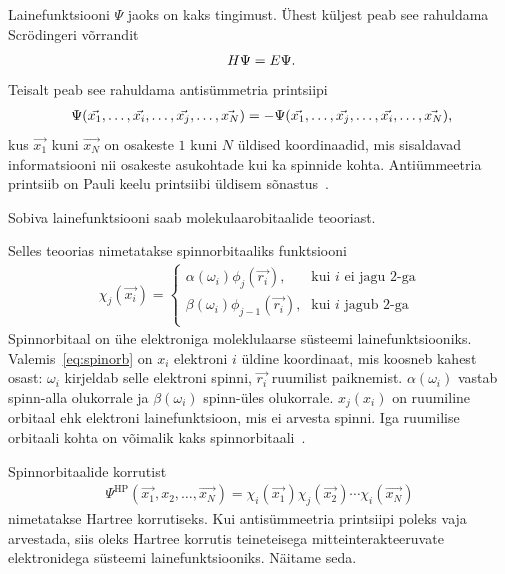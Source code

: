 \documentclass[12pt]{report}
\begin{document}
Lainefunktsiooni \(\Psi\) jaoks on kaks tingimust.
Ühest küljest peab see rahuldama Scrödingeri võrrandit
\begin{align}
    H \Psi = E \Psi \rlap{.}
\end{align}
Teisalt peab see rahuldama antisümmetria printsiipi
\begin{align}
    \Psi(\vec{x_1}, \ldots, \vec{x_i}, \ldots, \vec{x_j}, \ldots, \vec{x_N})
    = -\Psi(\vec{x_1}, \ldots, \vec{x_j}, \ldots, \vec{x_i}, \ldots, \vec{x_N}) \rlap{,}
\end{align}
kus \(\vec{x_1}\) kuni \(\vec{x_N}\) on osakeste \(1\) kuni \(N\) üldised koordinaadid, mis sisaldavad informatsiooni nii osakeste asukohtade kui ka spinnide kohta.
Antiümmeetria printsiib on Pauli keelu printsiibi üldisem sõnastus~\cite{szabo+ostlund}.

Sobiva lainefunktsiooni saab molekulaarobitaalide teooriast.

Selles teoorias nimetatakse spinnorbitaaliks funktsiooni
\begin{align}\label{eq:spinorb}
    \chi_j(\vec{x_i}) = \begin{cases}
        \alpha(\omega_i) \phi_j(\vec{r_i})\text{,} & \text{kui \(i\) ei jagu \(2\)-ga} \\
        \beta(\omega_i) \phi_{j-1}(\vec{r_i})\text{,} & \text{kui \(i\) jagub \(2\)-ga} \\
    \end{cases}
\end{align}
Spinnorbitaal on ühe elektroniga moleklulaarse süsteemi lainefunktsiooniks.
Valemis~\eqref{eq:spinorb} on \(x_i\) elektroni \(i\) üldine koordinaat, mis koosneb kahest osast: \(\omega_i\) kirjeldab selle elektroni spinni, \(\vec{r_i}\) ruumilist paiknemist.
\(\alpha(\omega_i)\) vastab spinn-alla olukorrale ja \(\beta(\omega_i)\) spinn-üles olukorrale.
\(x_j(x_i)\) on ruumiline orbitaal ehk elektroni lainefunktsioon, mis ei arvesta spinni.
Iga ruumilise orbitaali kohta on võimalik kaks spinnorbitaali~\cite{szabo+ostlund}.

Spinnorbitaalide korrutist
\begin{align}\label{eq:hp}
    \Psi^\text{HP}(\vec{x_1}, x_2, \ldots, \vec{x_N})
    = \chi_i(\vec{x_1}) \chi_j(\vec{x_2}) \cdots \chi_i(\vec{x_N})
\end{align}
nimetatakse Hartree korrutiseks.
Kui antisümmeetria printsiipi poleks vaja arvestada, siis oleks Hartree korrutis teineteisega mitteinterakteeruvate elektronidega süsteemi lainefunktsiooniks.
Näitame seda.
\end{document}
